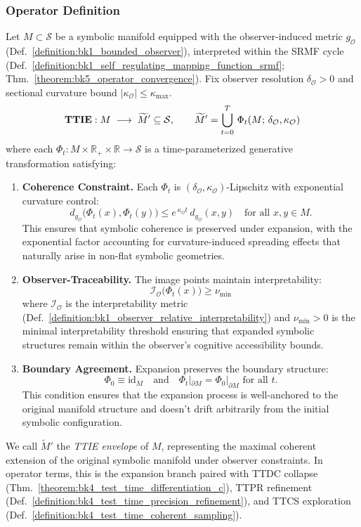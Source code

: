 \subsubsection{Operator Definition}
\begin{definition}
\label{definition:bk4_test_time_integrative_expansion}
Let $M\subset \mathcal{S}$ be a symbolic manifold equipped with the observer-induced metric $g_{\mathcal{O}}$ (Def.~\ref{definition:bk1_bounded_observer}), interpreted within the SRMF cycle (Def.~\ref{definition:bk1_self_regulating_mapping_function_srmf}; Thm.~\ref{theorem:bk5_operator_convergence}). Fix observer resolution $\delta_{\mathcal{O}}\!>\!0$ and sectional curvature bound $|\kappa_{\mathcal{O}}|\le \kappa_{\max}$.
\[
\text{\bf TTIE}: M\;\longrightarrow\;\widetilde{M}'\subseteq\mathcal{S},
\qquad
\widetilde{M}'=\bigcup_{t=0}^{T}\,
  \Phi_t\!\left(M;\,\delta_{\mathcal{O}},\kappa_{\mathcal{O}}\right)
\]
where each $\Phi_t: M \times \mathbb{R}_+ \times \mathbb{R} \to \mathcal{S}$ is a time-parameterized generative transformation satisfying:
\begin{enumerate}[label=\textbf{C\arabic*}]
\item \textbf{Coherence Constraint.} Each $\Phi_t$ is $(\delta_{\mathcal{O}},\kappa_{\mathcal{O}})$-Lipschitz with exponential curvature control:
\[
d_{g_{\mathcal{O}}}\!\bigl(\Phi_t(x),\Phi_t(y)\bigr)\le
e^{\,\kappa_{\mathcal{O}}t}\,d_{g_{\mathcal{O}}}(x,y)
\quad\text{for all } x,y\in M.
\]
This ensures that symbolic coherence is preserved under expansion, with the exponential factor accounting for curvature-induced spreading effects that naturally arise in non-flat symbolic geometries.

\item \textbf{Observer-Traceability.} The image points maintain interpretability:
\[
\mathcal{I}_{\mathcal{O}}\bigl(\Phi_t(x)\bigr)\ge\nu_{\min}
\]
where $\mathcal{I}_{\mathcal{O}}$ is the interpretability metric (Def.~\ref{definition:bk1_observer_relative_interpretability}) and $\nu_{\min} > 0$ is the minimal interpretability threshold ensuring that expanded symbolic structures remain within the observer's cognitive accessibility bounds.

\item \textbf{Boundary Agreement.} Expansion preserves the boundary structure:
\[
\Phi_0\equiv\mathrm{id}_M \quad \text{and} \quad
\Phi_t|_{\partial M}=\Phi_0|_{\partial M} \text{ for all } t.
\]
This condition ensures that the expansion process is well-anchored to the original manifold structure and doesn't drift arbitrarily from the initial symbolic configuration.
\end{enumerate}
We call $\widetilde{M}'$ the \emph{TTIE envelope} of $M$, representing the maximal coherent extension of the original symbolic manifold under observer constraints. In operator terms, this is the expansion branch paired with TTDC collapse (Thm.~\ref{theorem:bk4_test_time_differentiation_c}), TTPR refinement (Def.~\ref{definition:bk4_test_time_precision_refinement}), and TTCS exploration (Def.~\ref{definition:bk4_test_time_coherent_sampling}).
\end{definition}

